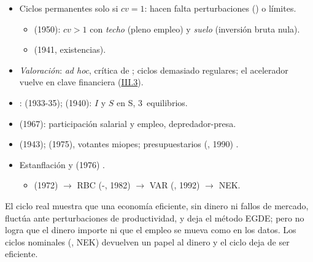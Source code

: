 \documentclass{article}
\begin{document}
\begin{columnas}
\begin{itemize}
\item Ciclos permanentes solo si $cv=1$: hacen falta perturbaciones () o límites.
  \begin{itemize}
  \item {} (1950): $cv>1$ con \emph{techo} (pleno empleo) y \emph{suelo} (inversión bruta nula).
  \item {} (1941, existencias).
  \end{itemize}
\item \emph{Valoración}: \emph{ad hoc}, crítica de ; ciclos demasiado regulares; el acelerador vuelve en clave financiera (\hyperref[rep:III.3]{III.3}).
\end{itemize}
\begin{itemize}
\item {}:  (1933-35);  (1940): $I$ y $S$ en S, 3~equilibrios.
\item {} (1967): participación salarial y empleo, depredador-presa.
\end{itemize}
\begin{itemize}
\item {} (1943);  (1975), votantes miopes; presupuestarios (, 1990) .
\end{itemize}
\begin{itemize}
\item Estanflación y  (1976) .
  \begin{itemize}
  \item {} (1972) $\to$ RBC (-, 1982) $\to$ VAR (, 1992) $\to$ NEK.
  \end{itemize}
\end{itemize}

\begin{ideaclave}
El ciclo real muestra que una economía eficiente, sin dinero ni fallos de mercado, fluctúa ante perturbaciones de productividad, y deja el método EGDE; pero no logra que el dinero importe ni que el empleo se mueva como en los datos. Los ciclos nominales (, NEK) devuelven un papel al dinero y el ciclo deja de ser eficiente.
\end{ideaclave}


\end{columnas}
\end{document}
